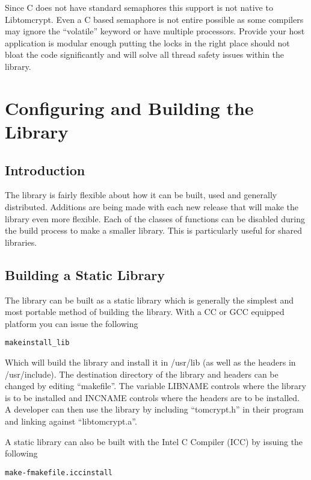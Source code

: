 \documentclass[a4paper]{book}
\begin{document}
Since C does not have standard semaphores this support is not native to Libtomcrypt.  Even a C based semaphore is not entire
possible as some compilers may ignore the ``volatile'' keyword or have multiple processors.  Provide your host application
is modular enough putting the locks in the right place should not bloat the code significantly and will solve all thread
safety issues within the library.

\chapter{Configuring and Building the Library}
\section{Introduction}
The library is fairly flexible about how it can be built, used and generally distributed.  Additions are being made with
each new release that will make the library even more flexible.  Each of the classes of functions can be disabled during
the build process to make a smaller library.  This is particularly useful for shared libraries.

\section{Building a Static Library}
The library can be built as a static library which is generally the simplest and most portable method of 
building the library.  With a CC or GCC equipped platform you can issue the following

\begin{alltt}
make install_lib
\end{alltt}

Which will build the library and install it in /usr/lib (as well as the headers in /usr/include).  The destination
directory of the library and headers can be changed by editing ``makefile''.  The variable LIBNAME controls
where the library is to be installed and INCNAME controls where the headers are to be installed.  A developer can 
then use the library by including ``tomcrypt.h'' in their program and linking against ``libtomcrypt.a''.

A static library can also be built with the Intel C Compiler  (ICC) by issuing the following

\begin{alltt}
make -f makefile.icc install
\end{alltt}
\end{document}
